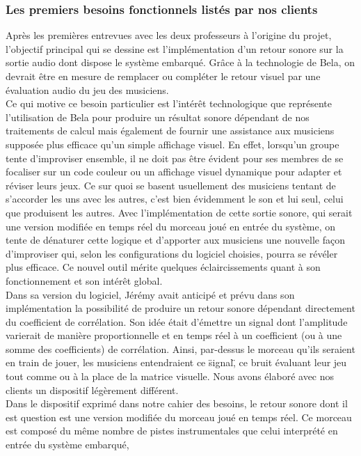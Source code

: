 \subsubsection{Les premiers besoins fonctionnels listés par nos clients}
Après les premières entrevues avec les deux professeurs à l'origine du
projet, l'objectif principal qui se dessine est l'implémentation d'un
retour sonore sur la sortie audio dont dispose le système
embarqué. Grâce à la technologie de Bela, on devrait être en mesure de
remplacer ou compléter le retour visuel par une évaluation audio du
jeu des musiciens. \\
Ce qui motive ce besoin particulier est l'intérêt technologique que
représente l'utilisation de Bela pour produire un résultat sonore
dépendant de nos traitements de calcul mais également de fournir une
assistance aux musiciens supposée plus efficace qu'un simple affichage
visuel. En effet, lorsqu'un groupe tente d'improviser ensemble, il ne
doit pas être évident pour ses membres de se focaliser sur un code
couleur ou un affichage visuel dynamique pour adapter et réviser leurs
jeux. Ce sur quoi se basent usuellement des musiciens tentant de
s'accorder les uns avec les autres, c'est bien évidemment le son et
lui seul, celui que produisent les autres. Avec l'implémentation de
cette sortie sonore, qui serait une version modifiée en temps réel du
morceau joué en entrée du système, on tente de dénaturer cette logique
et d'apporter aux musiciens une nouvelle façon d'improviser qui, selon
les configurations du logiciel choisies, pourra se révéler plus
efficace. Ce nouvel outil mérite quelques éclaircissements quant à son
fonctionnement et son intérêt global. \\
Dans sa version du logiciel, Jérémy avait anticipé et prévu dans son
implémentation la possibilité de produire un retour sonore dépendant
directement du coefficient de corrélation. Son idée était d'émettre un
signal dont l'amplitude varierait de manière proportionnelle et en
temps réel à un coefficient (ou à une somme des coefficients) de
corrélation. Ainsi, par-dessus le morceau qu'ils seraient en train de
jouer, les musiciens entendraient ce \"signal\", ce bruit évaluant
leur jeu tout comme ou à la place de la matrice visuelle. Nous
avons élaboré avec nos clients un dispositif légèrement différent. \\
Dans le dispositif exprimé dans notre cahier des besoins, le retour
sonore dont il est question est une version modifiée du morceau joué
en temps réel. Ce morceau est composé du même nombre de pistes
instrumentales que celui interprété en entrée du système embarqué,
